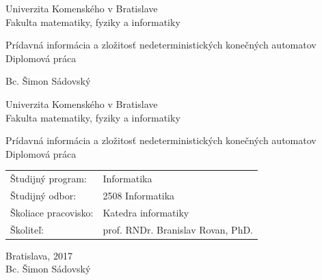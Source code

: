\documentclass[12pt, oneside]{book}
\def\mfrok{2017}
\def\mfnazov{Prídavná informácia a zložitosť nedeterministických konečných automatov}
\def\mftyp{Diplomová práca}
\def\mfautor{Bc. Šimon Sádovský}
\def\mfskolitel{prof. RNDr. Branislav Rovan, PhD.}
\def\mfkonzultant{tit. Meno Priezvisko, tit. }
\def\mfmiesto{Bratislava, \mfrok}
\def\mfodbor{2508 Informatika}
\def\program{ Informatika }
\def\mfpracovisko{ Katedra informatiky }
\begin{document}
     

\thispagestyle{empty}

\begin{center}
\sc\large
Univerzita Komenského v Bratislave\\
Fakulta matematiky, fyziky a informatiky

\vfill

{\LARGE\mfnazov}\\
\mftyp
\end{center}

\vfill

{\sc\large 
\noindent \mfrok \hspace*{9cm} \mfautor
}

\eject %


\thispagestyle{empty}
\noindent

\begin{center}
\sc  
\large
Univerzita Komenského v Bratislave\\
Fakulta matematiky, fyziky a informatiky

\vfill

{\LARGE\mfnazov}\\
\mftyp
\end{center}

\vfill

\noindent
\begin{tabular}{ll}
Študijný program: & \program \\
Študijný odbor: & \mfodbor \\
Školiace pracovisko: & \mfpracovisko \\
Školiteľ: & \mfskolitel \\
\end{tabular}

\vfill


\noindent \mfmiesto\\
\mfautor

\eject %




\end{document}
